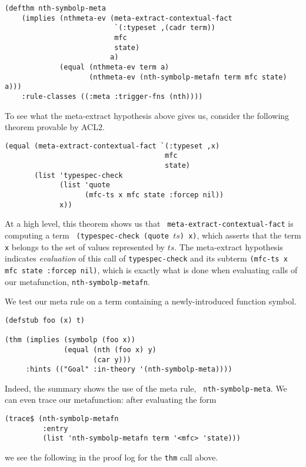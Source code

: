 \begin{verbatim}
(defthm nth-symbolp-meta
    (implies (nthmeta-ev (meta-extract-contextual-fact
                          `(:typeset ,(cadr term))
                          mfc
                          state)
                         a)
             (equal (nthmeta-ev term a)
                    (nthmeta-ev (nth-symbolp-metafn term mfc state) a)))
    :rule-classes ((:meta :trigger-fns (nth))))
\end{verbatim}

To see what the meta-extract hypothesis above gives us, consider the
following theorem provable by ACL2.

\begin{verbatim}
(equal (meta-extract-contextual-fact `(:typeset ,x)
                                      mfc
                                      state)
       (list 'typespec-check
             (list 'quote
                   (mfc-ts x mfc state :forcep nil))
             x))
\end{verbatim}

At a high level, this theorem shows us that {\tt
  meta-extract-contextual-fact} is computing a term {\tt
  (typespec-check (quote $ts$) x)}, which asserts that the term {\tt
  x} belongs to the set of values represented by $ts$.  The
meta-extract hypothesis indicates {\em evaluation} of this call of
{\tt typespec-check} and its subterm {\tt (mfc-ts x mfc state :forcep
  nil)}, which is exactly what is done when evaluating calls of our
metafunction, {\tt nth-symbolp-metafn}.

We test our meta rule on a term containing a newly-introduced
function symbol.

\begin{verbatim}
(defstub foo (x) t)

(thm (implies (symbolp (foo x))
              (equal (nth (foo x) y)
                     (car y)))
     :hints (("Goal" :in-theory '(nth-symbolp-meta))))
\end{verbatim}

\noindent Indeed, the summary shows the use of the meta rule, {\tt
  nth-symbolp-meta}.  We can even trace our metafunction: after
evaluating the form

\begin{verbatim}
(trace$ (nth-symbolp-metafn
         :entry
         (list 'nth-symbolp-metafn term '<mfc> 'state)))
\end{verbatim}

\noindent we see the following in the proof log for the {\tt thm} call
above.


